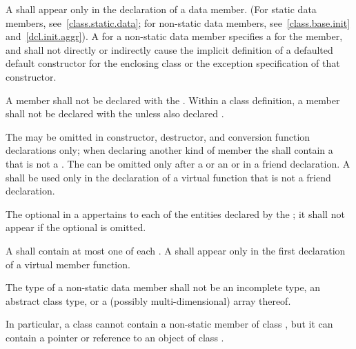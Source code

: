\pnum
A  shall appear only in the
declaration of a data member. (For static data members,
see~\ref{class.static.data}; for non-static data members,
see~\ref{class.base.init} and~\ref{dcl.init.aggr}).
A  for a non-static data member
%
specifies a  for the member, and
shall not directly or indirectly cause the implicit definition of a
defaulted default constructor for the enclosing class or the
exception specification of that constructor.

\pnum
A member shall not be declared with the 
. Within a class definition, a member shall not be declared with the   unless also declared .

\pnum
The  may be omitted in constructor, destructor,
and conversion function declarations only;
when declaring another kind of member the 
shall contain a  that is not a .
The
 can be omitted only after a
 or an  or in a
friend declaration. A
 shall be used only in the declaration of a
virtual function
that is not a friend declaration.

\pnum
The optional  in a 
appertains to each of the entities declared by the ;
it shall not appear if the optional  is omitted.

\pnum
A  shall contain at most one of each
.
A 
shall appear only in the first declaration of a virtual member
function.

\pnum
{}%
The type of a non-static data member shall not be an
incomplete type,
an abstract class type,
or a (possibly multi-dimensional) array thereof.
\begin{note}
In particular, a class  cannot contain
a non-static member of class ,
but it can contain a pointer or reference to an object of class .
\end{note}

